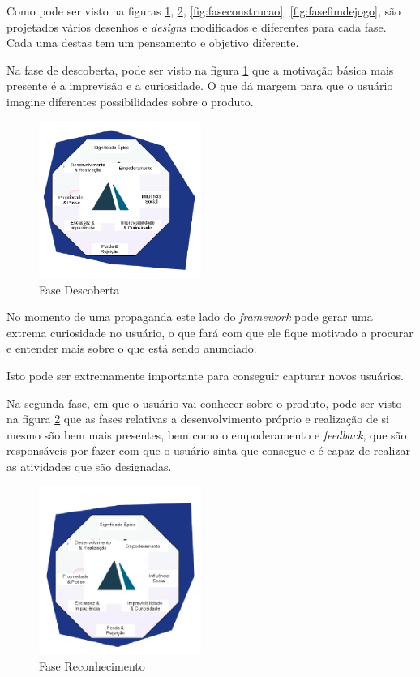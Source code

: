 Como pode ser visto na figuras \ref{fig:fasedescoberta}, \ref{fig:fasereconhecimento}, \ref{fig:faseconstrucao}, 
\ref{fig:fasefimdejogo}, são projetados vários
desenhos e \textit{designs} modificados e diferentes para cada fase. Cada uma destas
tem um pensamento e objetivo diferente.

Na fase de descoberta, pode ser visto na figura \ref{fig:fasedescoberta} que a motivação básica mais presente é
a imprevisão e a curiosidade. O que dá margem para que o usuário imagine diferentes
possibilidades sobre o produto. 

\begin{figure}[h]
    \centering
    \includegraphics[width=200px, scale=1]{figuras/fasedescoberta}
    \caption{Fase Descoberta}
    \label{fig:fasedescoberta}
\end{figure}

No momento de uma propaganda este lado do \textit{framework} pode gerar uma
extrema curiosidade no usuário, o que fará com que ele fique motivado a procurar
e entender mais sobre o que está sendo anunciado.

Isto pode ser extremamente importante para conseguir capturar novos usuários.

Na segunda fase, em que o usuário vai conhecer sobre o produto, pode ser visto
na figura \ref{fig:fasereconhecimento} que as fases relativas a desenvolvimento próprio e realização de si mesmo
são bem mais presentes, bem como o empoderamento e \textit{feedback}, que são 
responsáveis por fazer com que o usuário sinta que consegue e é capaz
de realizar as atividades que são designadas.

\begin{figure}[h]
    \centering
    \includegraphics[width=200px, scale=1]{figuras/fasereconhecimento}
    \caption{Fase Reconhecimento}
    \label{fig:fasereconhecimento}
\end{figure}

